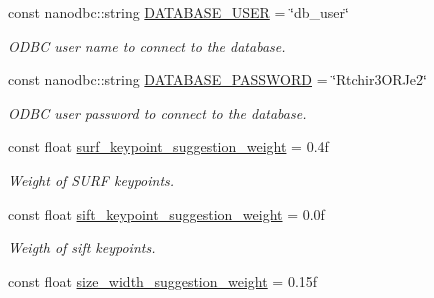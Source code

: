 \begin{DoxyCompactItemize}
\mbox{\label{namespacedto_1_1_configuration_aa2e88df362feee53bbdf5a34a131a672}} 
const nanodbc\+::string \mbox{\hyperlink{namespacedto_1_1_configuration_aa2e88df362feee53bbdf5a34a131a672}{D\+A\+T\+A\+B\+A\+S\+E\+\_\+\+U\+S\+ER}} = \char`\"{}db\+\_\+user\char`\"{}
\begin{DoxyCompactList}\small\item\em O\+D\+BC user name to connect to the database. \end{DoxyCompactList}\item 
\mbox{\label{namespacedto_1_1_configuration_a52255bb7eb3d14c9732bab276000f516}} 
const nanodbc\+::string \mbox{\hyperlink{namespacedto_1_1_configuration_a52255bb7eb3d14c9732bab276000f516}{D\+A\+T\+A\+B\+A\+S\+E\+\_\+\+P\+A\+S\+S\+W\+O\+RD}} = \char`\"{}Rtchir3\+O\+R\+Je2\char`\"{}
\begin{DoxyCompactList}\small\item\em O\+D\+BC user password to connect to the database. \end{DoxyCompactList}\item 
\mbox{\label{namespacedto_1_1_configuration_aecb68330644816b97afa2963edcc1800}} 
const float \mbox{\hyperlink{namespacedto_1_1_configuration_aecb68330644816b97afa2963edcc1800}{surf\+\_\+keypoint\+\_\+suggestion\+\_\+weight}} = 0.\+4f
\begin{DoxyCompactList}\small\item\em Weight of S\+U\+RF keypoints. \end{DoxyCompactList}\item 
\mbox{\label{namespacedto_1_1_configuration_a94e66b8afccc5835c1c1603c76bd72ad}} 
const float \mbox{\hyperlink{namespacedto_1_1_configuration_a94e66b8afccc5835c1c1603c76bd72ad}{sift\+\_\+keypoint\+\_\+suggestion\+\_\+weight}} = 0.\+0f
\begin{DoxyCompactList}\small\item\em Weigth of sift keypoints. \end{DoxyCompactList}\item 
\mbox{\label{namespacedto_1_1_configuration_a915ea57df64f55f79efeb34ab105c3fd}} 
const float \mbox{\hyperlink{namespacedto_1_1_configuration_a915ea57df64f55f79efeb34ab105c3fd}{size\+\_\+width\+\_\+suggestion\+\_\+weight}} = 0.\+15f

\end{DoxyCompactItemize}

